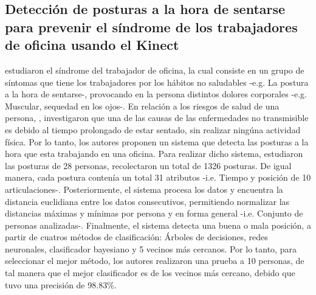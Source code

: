 \documentclass[twoside,twocolumn]{article}
\begin{document}
\subsection{Detecci\'on de posturas a la hora de sentarse para prevenir el s\'indrome de los trabajadores de oficina usando el Kinect} \label{tr:3}
 estudiaron el s\'indrome del trabajador de oficina, la cual consiste en un grupo de s\'intomas que tiene los trabajadores por los h\'abitos no saludables -e.g. La postura a la hora de sentarse-, provocando en la persona distintos dolores corporales -e.g. Muscular, sequedad en los ojos-.
\medbreak
En relaci\'on a los riesgos de salud de una persona, , investigaron que una de las causas de las enfermedades no transmisible es debido al tiempo prolongado de estar sentado, sin realizar ning\'una actividad f\'isica. Por lo tanto, los autores  proponen un sistema que detecta las posturas a la hora que esta trabajando en una oficina.
\medbreak
Para realizar dicho sistema,  estudiaron las posturas de 28 personas,  recolectaron un total de 1326 posturas. De igual manera, cada postura conten\'ia un total 31 atributos -i.e. Tiempo y posici\'on de 10 articulaciones-. Posteriormente, el sistema procesa los datos y encuentra la distancia euclidiana entre los datos consecutivos, permitiendo normalizar las distancias m\'aximas y m\'inimas por persona y en forma general -i.e. Conjunto de personas analizadas-.
\medbreak
Finalmente, el sistema detecta una buena o mala posici\'on, a partir de cuatros m\'etodos de clasificaci\'on: \'Arboles de decisiones, redes neuronales, clasificador bayesiano y 5 vecinos m\'as cercanos. Por lo tanto, para seleccionar el mejor m\'etodo, los autores realizaron una prueba a 10 personas, de tal manera que el mejor  clasificador es de los vecinos m\'as cercano, debido que tuvo una precisi\'on de  98.83\%. 
\end{document}
